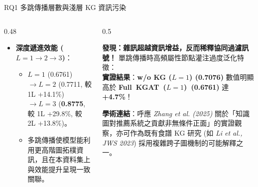 \documentclass[aspectratio=169, 10pt]{beamer}
\begin{document}
\begin{frame}{RQ1 多跳傳播層數與淺層 KG 資訊污染}
  \begin{columns}[t]
    \begin{column}{0.48\textwidth}
      \begin{itemize}
        \item \alert{\textbf{深度遞進效能 ($L=1\to 2\to 3$)}}：
          \begin{itemize}
            \item $L=1$ (0.6761) $\to L=2$ (0.7711, 較 1L +14.1\%) $\to L=3$ (\textbf{0.8775}, 較 1L +29.8\%, 較 2L +13.8\%)。
            \item 多跳傳播使模型能利用更高階圖拓樸資訊，且在本資料集上與效能提升呈現一致關聯。
          \end{itemize}
      \end{itemize}
    \end{column}

    \begin{column}{0.5\textwidth}
      \begin{alertblock}{\large\bfseries\color{HighlightRed} 發現：雜訊超越資訊增益，反而稀釋協同過濾訊號！}
        \small
        單跳傳播時高頻屬性節點灌注過度泛化特徵：\\[0.15cm]
        \textbf{實證結果}：\textbf{w/o KG ($L=1$) (0.7076)} 數值明顯高於 \mbox{\textbf{Full KGAT ($L=1$) (0.6761)}} 達 \textbf{\textcolor{HighlightRed}{+4.7\%}}！
      \end{alertblock}
      \vspace{0.15cm}
      \small \textbf{學術連結}：呼應 \textit{Zhang et al. (2025)} 關於「知識圖對推薦系統之貢獻非無條件正面」的實證觀察，亦可作為既有食譜 KG 研究 (如 \textit{Li et al., JWS 2023}) 採用複雜跨子圖機制的可能解釋之一。
    \end{column}
  \end{columns}
\end{frame}
\end{document}
